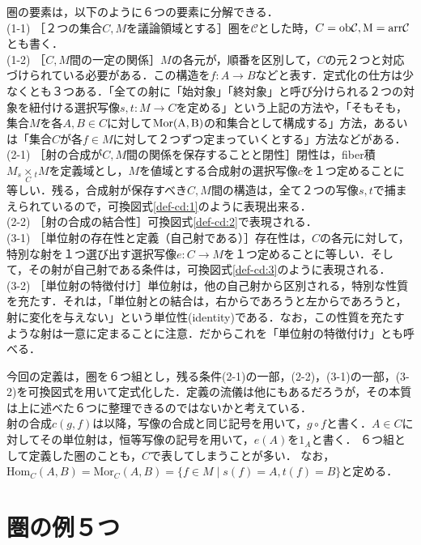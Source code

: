 \documentclass[uplatex, 12pt, dvipdfmx]{jsreport}
\begin{document}
圏の要素は，以下のように６つの要素に分解できる．\\
(1-1) \; ［２つの集合$C,M$を議論領域とする］圏を$\mathcal{C}$とした時，$C=\rm{ob}\mathcal{C}, M=\rm{arr}\mathcal{C}$とも書く．\\
(1-2) \; ［$C,M$間の一定の関係］$M$の各元が，順番を区別して，$C$の元２つと対応づけられている必要がある．この構造を$f:A\rightarrow B$などと表す．定式化の仕方は少なくとも３つある．「全ての射に「始対象」「終対象」と呼び分けられる２つの対象を紐付ける選択写像$s,t:M\rightarrow C$を定める」という上記の方法や，「そもそも，集合$M$を各$A,B\in C$に対して$\rm{Mor}(A,B)$の和集合として構成する」方法，あるいは「集合$C$が各$f\in M$に対して２つずつ定まっていくとする」方法などがある．\\
(2-1) \; ［射の合成が$C,M$間の関係を保存することと閉性］閉性は，fiber積$M_s\underset{C}{\times}{}_tM$を定義域とし，$M$を値域とする合成射の選択写像$c$を１つ定めることに等しい．残る，合成射が保存すべき$C,M$間の構造は，全て２つの写像$s,t$で捕まえられているので，可換図式\ref{def-cd:1}のように表現出来る．\\
(2-2) \; ［射の合成の結合性］可換図式\ref{def-cd:2}で表現される．\\
(3-1) \; ［単位射の存在性と定義（自己射である）］存在性は，$C$の各元に対して，特別な射を１つ選び出す選択写像$e:C\rightarrow M$を１つ定めることに等しい．そして，その射が自己射である条件は，可換図式\ref{def-cd:3}のように表現される．\\
(3-2) \; ［単位射の特徴付け］単位射は，他の自己射から区別される，特別な性質を充たす．それは，「単位射との結合は，右からであろうと左からであろうと，射に変化を与えない」という単位性(identity)である．なお，この性質を充たすような射は一意に定まることに注意．だからこれを「単位射の特徴付け」とも呼べる．\par

今回の定義は，圏を６つ組とし，残る条件(2-1)の一部，(2-2)，(3-1)の一部，(3-2)を可換図式を用いて定式化した．定義の流儀は他にもあるだろうが，その本質は上に述べた６つに整理できるのではないかと考えている．\\
射の合成$c(g,f)$は以降，写像の合成と同じ記号を用いて，$g\circ f$と書く．$A\in C$に対してその単位射は，恒等写像の記号を用いて，$e(A)$を$1_A$と書く．
６つ組として定義した圏のことも，$C$で表してしまうことが多い．
なお，$\mathrm{Hom}_C(A,B)=\mathrm{Mor}_C(A,B)=\{ f\in M\mid s(f)=A, t(f)=B \}$と定める．

\section{圏の例５つ}
\end{document}
